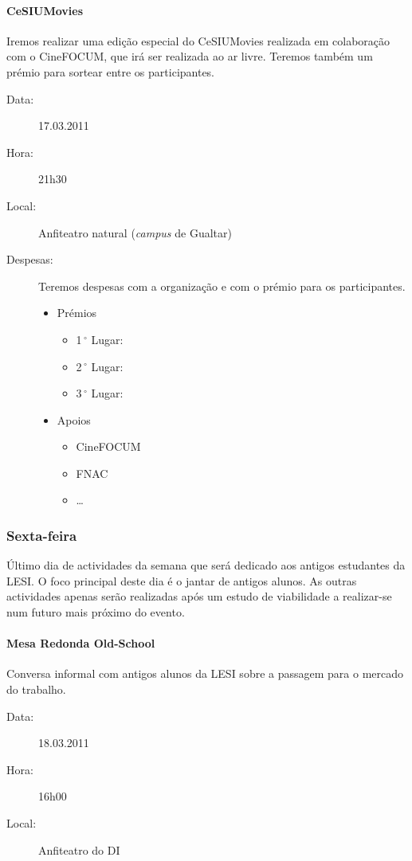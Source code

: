 \paragraph{CeSIUMovies}
Iremos realizar uma edição especial do CeSIUMovies realizada em colaboração com o CineFOCUM, que irá ser realizada ao ar livre. Teremos também um prémio para sortear entre os participantes.
\begin{description}
\item[Data:] 17.03.2011
\item[Hora:] 21h30
\item[Local:] Anfiteatro natural (\emph{campus} de Gualtar)
\item[Despesas:] Teremos despesas com a organização e com o prémio para os participantes.
\begin{itemize}
\item Prémios
\begin{itemize}
\item 1$\,^{\circ}$ Lugar:
\item 2$\,^{\circ}$ Lugar:
\item 3$\,^{\circ}$ Lugar:
\end{itemize}
\item Apoios
\begin{itemize}
\item CineFOCUM
\item FNAC
\item \dots
\end{itemize}
\end{itemize}
\end{description}
\subsubsection*{Sexta-feira}
Último dia de actividades da semana que será dedicado aos antigos estudantes da LESI. O foco principal deste dia é o jantar de antigos alunos. As outras actividades apenas serão realizadas após um estudo de viabilidade a realizar-se num futuro mais próximo do evento.  
%
\paragraph{Mesa Redonda Old-School}
Conversa informal com antigos alunos da LESI sobre a passagem para o mercado do trabalho.
\begin{description}
\item[Data:] 18.03.2011
\item[Hora:] 16h00
\item[Local:] Anfiteatro do DI
\end{description}
%
